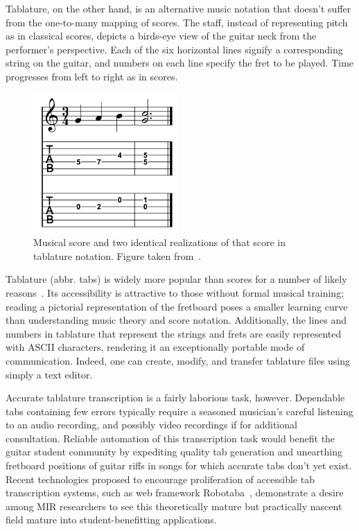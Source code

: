 \documentclass[12pt]{cmuthesis}
\begin{document}
Tablature, on the other hand, is an alternative music notation that doesn't suffer from the one-to-many mapping of scores. The staff, instead of representing pitch as in classical scores, depicts a birds-eye view of the guitar neck from the performer's perspective. Each of the six horizontal lines signify a corresponding string on the guitar, and numbers on each line specify the fret to be played. Time progresses from left to right as in scores. 

\begin{figure}[h] 
\label{fig:score-tabs}
\centering
\includegraphics[scale=0.8]{score-tabs}
\caption{Musical score and two identical realizations of that score in tablature notation. Figure taken from~\cite{barbanchoi2012}.}
\end{figure}

Tablature (abbr. tabs) is widely more popular than scores for a number of likely reasons~\cite{macrae2010}. Its accessibility is attractive to those without formal musical training; reading a pictorial representation of the fretboard poses a smaller learning curve than understanding music theory and score notation. Additionally, the lines and numbers in tablature that represent the strings and frets are easily represented with ASCII characters, rendering it an exceptionally portable mode of communication. Indeed, one can create, modify, and transfer tablature files using simply a text editor.

Accurate tablature transcription is a fairly laborious task, however. Dependable tabs containing few errors typically require a seasoned musician's careful listening to an audio recording, and possibly video recordings if for additional consultation. Reliable automation of this transcription task would benefit the guitar student community by expediting quality tab generation and unearthing fretboard positions of guitar riffs in songs for which accurate tabs don't yet exist. Recent technologies proposed to encourage proliferation of accessible tab transcription systems, such as web framework Robotaba~\cite{burlet2013}, demonstrate a desire among MIR researchers to see this theoretically mature but practically nascent field mature into student-benefitting applications. 
\end{document}
